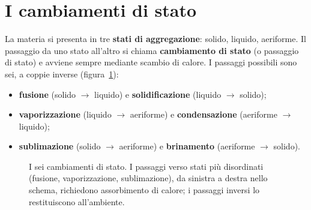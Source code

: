 \section[I cambiamenti di stato]{I cambiamenti di stato}

La materia si presenta in tre \textbf{stati di aggregazione}: solido, liquido, aeriforme. Il passaggio da uno stato all'altro si chiama \textbf{cambiamento di stato} (o passaggio di stato) e avviene sempre mediante scambio di calore. I passaggi possibili sono sei, a coppie inverse (figura~\ref{fig:cambiamenti-stato}):
\begin{itemize}
    \item \textbf{fusione} (solido $\to$ liquido) e \textbf{solidificazione} (liquido $\to$ solido);
    \item \textbf{vaporizzazione} (liquido $\to$ aeriforme) e \textbf{condensazione} (aeriforme $\to$ liquido);
    \item \textbf{sublimazione} (solido $\to$ aeriforme) e \textbf{brinamento} (aeriforme $\to$ solido).
\end{itemize}

\begin{figure}[!htbp]
    \centering
    \caption{I sei cambiamenti di stato. I passaggi verso stati più disordinati (fusione, vaporizzazione, sublimazione), da sinistra a destra nello schema, richiedono assorbimento di calore; i passaggi inversi lo restituiscono all'ambiente.}
    \label{fig:cambiamenti-stato}
\end{figure}

